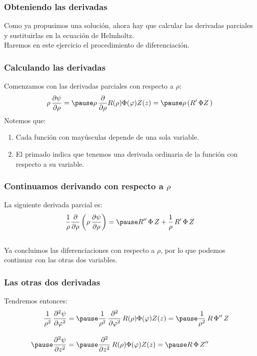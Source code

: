 \documentclass[12pt]{beamer}
\begin{document}
\begin{frame}
\frametitle{Obteniendo las derivadas}
Como ya propusimos una solución, ahora hay que calcular las derivadas parciales y sustituirlas en la ecuación de Helmholtz.
\\
\bigskip
\pause
Haremos en este ejercicio el procedimiento de diferenciación.
\end{frame}
\begin{frame}
\frametitle{Calculando las derivadas}
Comenzamos con las derivadas parciales con respecto a $\rho$:
\pause
\begin{eqnarray*}
\rho \, \pdv{\psi}{\rho} = \pause \rho \, \pdv{\rho} R(\rho) \Phi (\varphi) Z(z) = \pause \rho \left( \pderivada{R} \, \Phi Z \, \right)
\end{eqnarray*}
\pause
Notemos que:
\begin{enumerate}[<+->]
\item Cada función con mayúsculas depende de una sola variable.
\item El primado indica que tenemos una derivada ordinaria de la función con respecto a su variable.
\end{enumerate}
\end{frame}
\begin{frame}
\frametitle{Continuamos derivando con respecto a $\rho$}
La siguiente derivada parcial es:
\begin{align*}
\dfrac{1}{\rho} \pdv{\rho} \left( \rho \, \pdv{\psi}{\rho}  \right) = \pause \sderivada{R} \, \Phi \, Z + \dfrac{1}{\rho} \, \pderivada{R} \, \Phi \, Z
\end{align*}
\\
\bigskip
\pause
Ya concluimos las diferenciaciones con respecto a $\rho$, por lo que podemos continuar con las otras dos variables.
\end{frame}
\begin{frame}
\frametitle{Las otras dos derivadas}
Tendremos entonces:
\begin{eqnarray*}
\begin{aligned}
\dfrac{1}{\rho^{2}} \, \pdv[2]{\psi}{\varphi} &= \pause \dfrac{1}{\rho^{2}} \, \pdv[2]{\varphi} \, R(\rho) \Phi (\varphi) Z(z) = \pause \dfrac{1}{\rho^{2}} \, R \, \sderivada{\Phi} \, Z \\[1em] \pause
\pdv[2]{\psi}{z} &= \pause \pdv[2]{z} \, R(\rho) \Phi (\varphi) Z(z) = \pause R \, \Phi \, \sderivada{Z}
\end{aligned}
\end{eqnarray*}
\end{frame}
\end{document}
